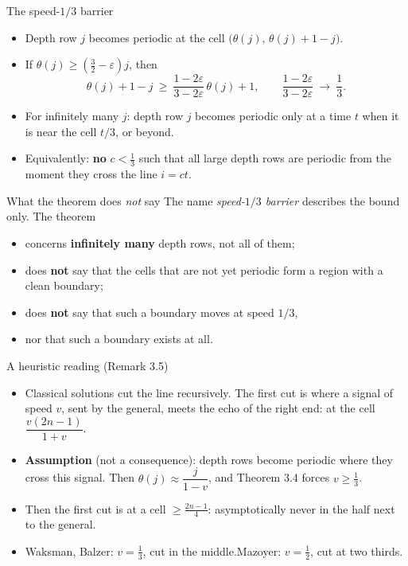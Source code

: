 \begin{frame}{The speed-$1/3$ barrier}
\begin{itemize}
\item Depth row $j$ becomes periodic at the cell $\bigl(\theta(j),\,\theta(j)+1-j\bigr)$.
\item If $\theta(j)\ge(\frac32-\varepsilon)j$, then
\[\theta(j)+1-j\ \ge\ \frac{1-2\varepsilon}{3-2\varepsilon}\,\theta(j)+1,\qquad \frac{1-2\varepsilon}{3-2\varepsilon}\ \to\ \frac13 .\]
\item For infinitely many $j$: depth row $j$ becomes periodic only at a time $t$ when it is near the cell $t/3$, or beyond.
\item Equivalently: \textbf{no} $c<\frac13$ such that all large depth rows are periodic from the moment they cross the line $i=ct$.
\end{itemize}
\end{frame}

\begin{frame}{What the theorem does \emph{not} say}
\vspace{2ex}
The name \emph{speed-$1/3$ barrier} describes the bound only. The theorem
\begin{itemize}
\item concerns \textbf{infinitely many} depth rows, not all of them;
\item does \textbf{not} say that the cells that are not yet periodic form a region with a clean boundary;
\item does \textbf{not} say that such a boundary moves at speed $1/3$,
\item nor that such a boundary exists at all.
\end{itemize}
\end{frame}

\begin{frame}{A heuristic reading (Remark 3.5)}
\begin{itemize}
\item Classical solutions cut the line recursively. The first cut is where a signal of speed $v$, sent by the general, meets the echo of the right end: at the cell $\dfrac{v(2n-1)}{1+v}$.
\item \textbf{Assumption} (not a consequence): depth rows become periodic where they cross this signal. Then $\theta(j)\approx\dfrac{j}{1-v}$, and Theorem 3.4 forces $v\ge\frac13$.
\item Then the first cut is at a cell $\ge\frac{2n-1}4$: asymptotically never in the half next to the general.
\item Waksman, Balzer: $v=\frac13$, cut in the middle.\quad Mazoyer: $v=\frac12$, cut at two thirds.
\end{itemize}
\end{frame}

